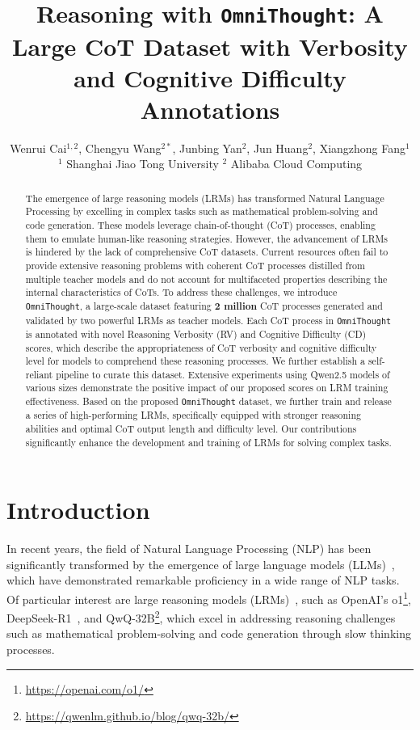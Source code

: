 \documentclass{article}
\title{Reasoning with \texttt{OmniThought}: A Large CoT Dataset with Verbosity and Cognitive Difficulty Annotations}
\author{
Wenrui Cai$^{1,2}$, Chengyu Wang$^{2*}$, Junbing Yan$^{2}$, Jun Huang$^{2}$, Xiangzhong Fang$^{1}$\\
$^1$ Shanghai Jiao Tong University $^2$ Alibaba Cloud Computing
}
\begin{document}
\maketitle


\begin{abstract}
The emergence of large reasoning models (LRMs) has transformed Natural Language Processing by excelling in complex tasks such as mathematical problem-solving and code generation. These models leverage chain-of-thought (CoT) processes, enabling them to emulate human-like reasoning strategies. However, the advancement of LRMs is hindered by the lack of comprehensive CoT datasets. Current resources often fail to provide extensive reasoning problems with coherent CoT processes distilled from multiple teacher models and do not account for multifaceted properties describing the internal characteristics of CoTs. To address these challenges, we introduce \texttt{OmniThought}, a large-scale dataset featuring \textbf{2 million} CoT processes generated and validated by two powerful LRMs as teacher models. Each CoT process in \texttt{OmniThought} is annotated with novel Reasoning Verbosity (RV) and Cognitive Difficulty (CD) scores, which describe the appropriateness of CoT verbosity and cognitive difficulty level for models to comprehend these reasoning processes. We further establish a self-reliant pipeline to curate this dataset. Extensive experiments using Qwen2.5 models of various sizes demonstrate the positive impact of our proposed scores on LRM training effectiveness. Based on the proposed \texttt{OmniThought} dataset, we further train and release a series of high-performing LRMs, specifically equipped with stronger reasoning abilities and optimal CoT output length and difficulty level. Our contributions significantly enhance the development and training of LRMs for solving complex tasks.
\end{abstract}


\section{Introduction}
In recent years, the field of Natural Language Processing (NLP) has been significantly transformed by the emergence of large language models (LLMs)~\cite{DBLP:journals/corr/abs-2303-18223}, which have demonstrated remarkable proficiency in a wide range of NLP tasks. Of particular interest are large reasoning models (LRMs)~\cite{DBLP:journals/corr/abs-2501-09686}, such as OpenAI's o1\footnote{\url{https://openai.com/o1/}}, DeepSeek-R1~\cite{DBLP:journals/corr/abs-2501-12948}, and QwQ-32B\footnote{\url{https://qwenlm.github.io/blog/qwq-32b/}}, which excel in addressing reasoning challenges such as mathematical problem-solving and code generation through slow thinking processes.
\end{document}
